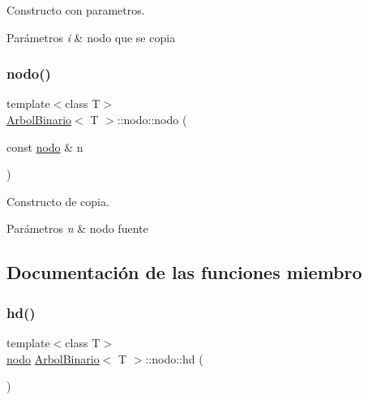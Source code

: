 Constructo con parametros. 


\begin{DoxyParams}{Parámetros}
{\em i} & nodo que se copia \\
\hline
\end{DoxyParams}
\mbox{\label{classArbolBinario_1_1nodo_ab73087719276b298b3801c772da82fdf}} 
\subsubsection{\texorpdfstring{nodo()}{nodo()}\hspace{0.1cm}{\footnotesize\ttfamily [2/2]}}
{\footnotesize\ttfamily template$<$class T$>$ \\
\hyperlink{classArbolBinario}{Arbol\+Binario}$<$ T $>$\+::nodo\+::nodo (\begin{DoxyParamCaption}\item[{const \hyperlink{classArbolBinario_1_1nodo}{nodo} \&}]{n }\end{DoxyParamCaption})\hspace{0.3cm}{\ttfamily [inline]}}



Constructo de copia. 


\begin{DoxyParams}{Parámetros}
{\em n} & nodo fuente \\
\hline
\end{DoxyParams}


\subsection{Documentación de las funciones miembro}
\mbox{\label{classArbolBinario_1_1nodo_ab4bd1d7b0ae90543b89a3b7e4d7d4470}} 
\subsubsection{\texorpdfstring{hd()}{hd()}}
{\footnotesize\ttfamily template$<$class T$>$ \\
\hyperlink{classArbolBinario_1_1nodo}{nodo} \hyperlink{classArbolBinario}{Arbol\+Binario}$<$ T $>$\+::nodo\+::hd (\begin{DoxyParamCaption}{ }\end{DoxyParamCaption})\hspace{0.3cm}{\ttfamily [inline]}}



